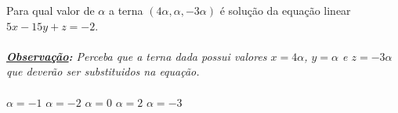 Para qual valor de $\alpha$ a terna $(4\alpha,\alpha,-3\alpha)$ é solução da equação linear $5x-15y+z=-2$.\\\vspace{-3mm}\\
{\it {\bf\underline{Observação}:} Perceba que a terna dada possui valores $x=4\alpha$, $y=\alpha$ e $z=-3\alpha$ que deverão ser substituidos na equação.}\\\vspace{-1cm}\\

$\alpha=-1$
$\alpha=-2$
$\alpha=0$
$\alpha=2$
$\alpha=-3$


